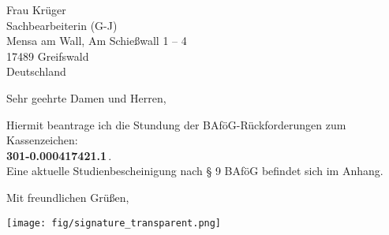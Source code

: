 \documentclass[numbers=noenddot,12pt,a4paper]{letter}
\begin{document}
\begin{letter}{%
    Frau Krüger\\%
    Sachbearbeiterin (G-J)\\%
    Mensa am Wall, Am Schießwall 1 – 4\\%
    17489 Greifswald\\
    Deutschland%
    }
        \opening{Sehr geehrte Damen und Herren,}%
        Hiermit beantrage ich die Stundung der BAföG-Rückforderungen zum Kassenzeichen:\\%
        \textbf{301-0.000417421.1}\,.\\%
        Eine aktuelle Studienbescheinigung nach § 9 BAföG befindet sich im Anhang.%

        \vspace{2.0cm}%
        \closing{Mit freundlichen Grüßen,}%
        \hspace{6.0cm}%
        \texttt{[image: fig/signature\_transparent.png]}%
        \newline%
    \end{letter}%

    \newpage%
    \begin{center}%
    \end{center}%
\end{document}
